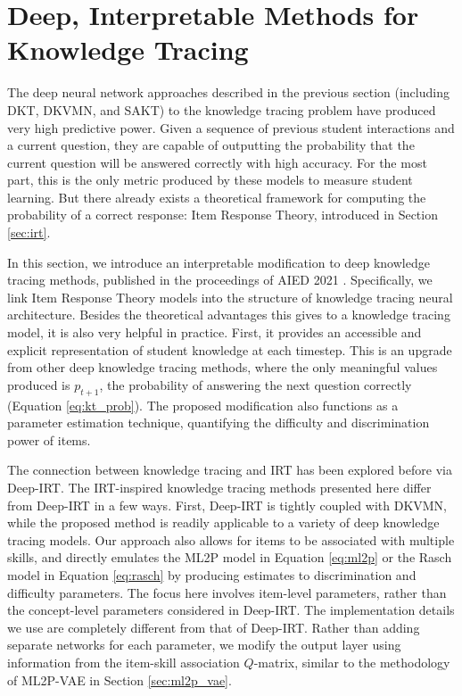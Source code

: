 \chapter{Deep, Interpretable Methods for Knowledge Tracing} \label{ch:kt_methods}

The deep neural network approaches described in the previous section (including DKT, DKVMN, and SAKT) to the knowledge tracing problem have produced very high predictive power. Given a sequence of previous student interactions and a current question, they are capable of outputting the probability that the current question will be answered correctly with high accuracy. For the most part, this is the only metric produced by these models to measure student learning. But there already exists a theoretical framework for computing the probability of a correct response: Item Response Theory, introduced in Section \ref{sec:irt}.

In this section, we introduce an interpretable modification to deep knowledge tracing methods, published in the proceedings of AIED 2021 \cite{kt_irt}. Specifically, we link Item Response Theory models into the structure of knowledge tracing neural architecture. Besides the theoretical advantages this gives to a knowledge tracing model, it is also very helpful in practice. First, it provides an accessible and explicit representation of student knowledge at each timestep. This is an upgrade from other deep knowledge tracing methods, where the only meaningful values produced is $p_{t+1}$, the probability of answering the next question correctly (Equation \ref{eq:kt_prob}). The proposed modification also functions as a parameter estimation technique, quantifying the difficulty and discrimination power of items.

The connection between knowledge tracing and IRT has been explored before via Deep-IRT. The IRT-inspired knowledge tracing methods presented here differ from Deep-IRT in a few ways. First, Deep-IRT is tightly coupled with DKVMN, while the proposed method is readily applicable to a variety of deep knowledge tracing models. Our approach also allows for items to be associated with multiple skills, and directly emulates the ML2P model in Equation \ref{eq:ml2p} or the Rasch model in Equation \ref{eq:rasch} by producing estimates to discrimination and difficulty parameters. The focus here involves item-level parameters, rather than the concept-level parameters considered in Deep-IRT. The implementation details we use are completely different from that of Deep-IRT. Rather than adding separate networks for each parameter, we modify the output layer using information from the item-skill association $Q$-matrix, similar to the methodology of ML2P-VAE in Section \ref{sec:ml2p_vae}.

